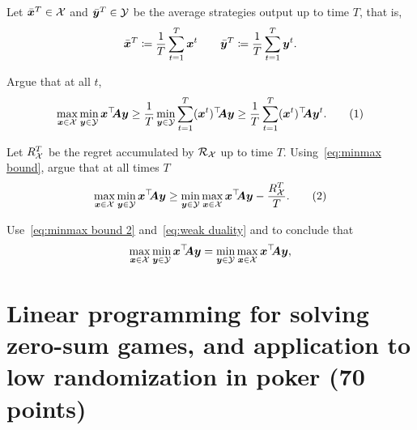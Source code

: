 \documentclass{homework}
\begin{document}
Let $\bar{\bm{x}}^T \in \mathcal{X}$ and $\bar{\bm{y}}^T \in \mathcal{Y}$ be the average strategies output up to time $T$, that is,
\[
    \bar{\bm{x}}^T \coloneqq \frac{1}{T}\sum_{t=1}^T \bm{x}^t \qquad \bar{\bm{y}}^T \coloneqq \frac{1}{T}\sum_{t=1}^T \bm{y}^t.
\] 

\begin{problem}[5 points]
    Argue that at all $t$,
    \[
        \max_{\vec{x}\in\cX}\min_{\vec{y}\in\cY} \vec{x}^\top\!\! \vec{A} \vec{y} \ge \frac{1}{T} \min_{\vec{y}\in\cY}\sum_{t=1}^T (\vec{x}^t)^\top\!\!\vec{A}\vec{y} \ge \frac{1}{T}\sum_{t=1}^T (\vec{x}^t)^\top\!\!\vec{A}\vec{y}^t.
        \numberthis{eq:minmax bound}
    \]
\end{problem}
\begin{solution}
\end{solution}


\begin{problem}[5 points]
    Let $R_{\mathcal{X}}^T$ be the regret accumulated by $\mathcal{R}_{\mathcal{X}}$ up to time $T$. Using~\eqref{eq:minmax bound}, argue that at all times $T$
    \[
        \max_{\vec{x}\in\cX}\min_{\vec{y}\in\cY} \vec{x}^\top\!\! \vec{A} \vec{y} \ge \min_{\vec{y}\in\cY}\max_{\vec{x}\in\cX} \vec{x}^\top\!\! \vec{A} \vec{y} - \frac{R^T_\cX}{T}.
        \numberthis{eq:minmax bound 2}
    \]
\end{problem}
\begin{solution}
\end{solution}


\begin{problem}[2 points]
    Use~\eqref{eq:minmax bound 2} and~\eqref{eq:weak duality} and to conclude that
    \[
        \max_{\bm{x}\in\mathcal{X}}\min_{\bm{y}\in\mathcal{Y}} \bm{x}^\top\!\! \bm{A} \bm{y} = \min_{\bm{y}\in\mathcal{Y}}\max_{\bm{x}\in\mathcal{X}} \bm{x}^\top\!\! \bm{A} \bm{y},
    \]
\end{problem}
\begin{solution}
\end{solution}


\section{Linear programming for solving zero-sum games, and application to low randomization in poker (70 points)}
\end{document}
